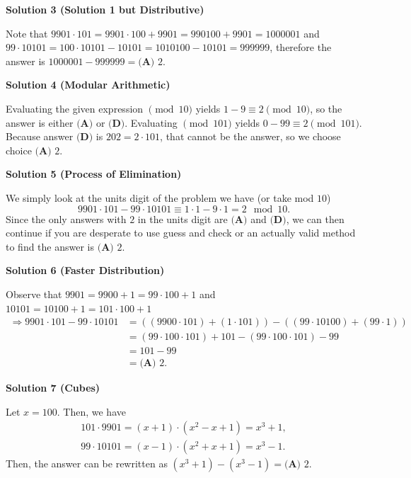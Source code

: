\begin{enumerate}
 



\textbf{Solution 3 (Solution 1 but Distributive)}

Note that $9901\cdot101=9901\cdot100+9901=990100+9901=1000001$ and  $99\cdot10101=100\cdot10101-10101=1010100-10101=999999$, therefore the answer is $1000001-999999=\boxed{\textbf{(A) }2}$.

 



\textbf{Solution 4 (Modular Arithmetic)}

Evaluating the given expression $\pmod{10}$ yields $1-9\equiv 2 \pmod{10}$, so the answer is either $\textbf{(A)}$ or $\textbf{(D)}$. Evaluating $\pmod{101}$ yields $0-99\equiv 2\pmod{101}$. Because answer $\textbf{(D)}$ is $202=2\cdot 101$, that cannot be the answer, so we choose choice $\boxed{\textbf{(A) }2}$.

 



\textbf{Solution 5 (Process of Elimination)}

We simply look at the units digit of the problem we have (or take mod $10$)
 \[9901\cdot101-99\cdot10101 \equiv 1\cdot1 - 9\cdot1 = 2 \mod{10}.\]Since the only answers with $2$ in the units digit are $\textbf{(A)}$ and $\textbf{(D)}$, we can then continue if you are desperate to use guess and check or an actually valid method to find the answer is $\boxed{\textbf{(A) }2}$.

 



\textbf{Solution 6 (Faster Distribution)}

Observe that $9901=9900+1=99\cdot100+1$ and $10101=10100+1=101\cdot100+1$
 \begin{align*} \Rightarrow9901\cdot101-99\cdot10101 & = ((9900\cdot101)+(1\cdot101))-((99\cdot10100)+(99\cdot1)) \\ &=(99\cdot100\cdot101)+101-(99\cdot100\cdot101)-99 \\ &=101-99 \\ &=\boxed{\textbf{(A) }2}. \end{align*}





\textbf{Solution 7 (Cubes)}

Let $x=100$. Then, we have\begin{align*}101\cdot 9901=(x+1)\cdot (x^2-x+1)=x^3+1, \\99\cdot 10101=(x-1)\cdot (x^2+x+1)=x^3-1.\end{align*}
Then, the answer can be rewritten as $(x^3+1)-(x^3-1)= \boxed{\textbf{(A) }2}.$





\end{enumerate}
